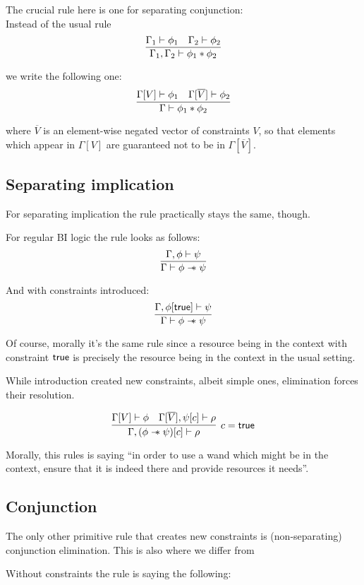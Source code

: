 The crucial rule here is one for separating conjunction:\\
Instead of the usual rule
$$\infer{\Gamma_1, \Gamma_2 \vdash \phi_1 \ast \phi_2}
      {\Gamma_1 \vdash \phi_1 &
       \Gamma_2 \vdash \phi_2}$$

we write the following one:
$$\infer{\Gamma \vdash \phi_1 \ast \phi_2}
      {\Gamma[V] \vdash \phi_1 &
       \Gamma[\overline{V}] \vdash \phi_2}$$

where $\overline{V}$ is an element-wise negated vector of constraints $V$, so
that elements which appear in $\Gamma[V]$ are guaranteed not to be in $\Gamma[\overline{V}]$.

\subsection{Separating implication}

For separating implication the rule practically stays the same, though.

For regular BI logic the rule looks as follows:
$$
\infer{\Gamma \vdash \phi \wand \psi}
      {\Gamma , \phi \vdash \psi}
$$

And with constraints introduced:
$$
\infer{\Gamma \vdash \phi \wand \psi}
      {\Gamma , \phi[\true] \vdash \psi}
$$

Of course, morally it's the same rule since a resource being in the context with constraint $\textsf{true}$ is precisely the resource being in the context in the usual setting.

While introduction created new constraints, albeit simple ones, elimination forces their resolution.

$$
\infer[ c = \true ]
      {\Gamma, (\phi \wand \psi)[c] \vdash \rho}
      {\Gamma[V] \vdash \phi &
       \Gamma[\overline{V}], \psi[c] \vdash \rho}
$$

Morally, this rules is saying ``in order to use a wand which might be in the context, ensure that it is indeed there and provide resources it needs''.

\subsection{Conjunction}

The only other primitive rule that creates new constraints is (non-separating) conjunction elimination.
This is also where we differ from \citet{Harland_Pym_2003}

Without constraints the rule is saying the following:


